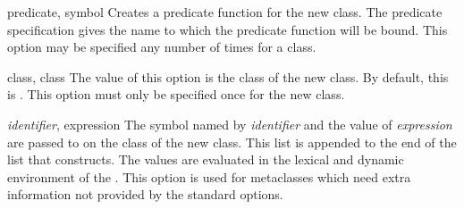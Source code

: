\begin{optDefinition}
\begin{options}
    \item[predicate, symbol]%
    Creates a predicate function for the new class.  The predicate specification
    gives the name to which the predicate function will be bound.  This option
    may be specified any number of times for a class.

    \item[class, class]%
    The value of this option is the class of the new class.  By default, this is
    .  This option must only be specified once for the new
    class.

    \item[{\em identifier}, expression]%
    The symbol named by {\em identifier} and the value of {\em expression} are
    passed to  on the class of the new class.  This list is
    appended to the end of the list that  constructs.  The
    values are evaluated in the lexical and dynamic environment of the
    .  This option is used for metaclasses which need extra
    information not provided by the standard options.
\end{options}
%
\end{optDefinition}


